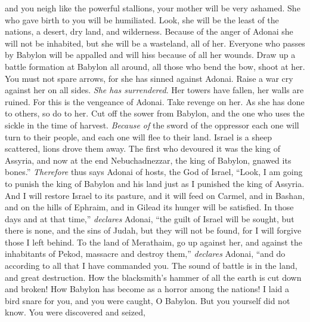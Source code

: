 \begin{biblechapter}
and you neigh like the powerful stallions,
\verse your mother will be very ashamed. 
She who gave birth to you will be humiliated. 
Look, she will be the least of the nations, 
a desert, dry land, and wilderness.
\verse Because of the anger of Adonai she will not be inhabited, 
but she will be a wasteland, all of her. 
Everyone who passes by Babylon will be appalled 
and will hiss because of all her wounds.
\verse Draw up a battle formation at Babylon all around, 
all those who bend the bow, shoot at her. 
You must not spare arrows, 
for she has sinned against Adonai.
\verse Raise a war cry against her on all sides. 
\textit{She has surrendered}. 
Her towers have fallen, 
her walls are ruined. 
For this is the vengeance of Adonai. 
Take revenge on her. 
As she has done to others, 
so do to her.
\verse Cut off the sower from Babylon, 
and the one who uses the sickle in the time of harvest. 
\textit{Because of} the sword of the oppressor 
each one will turn to their people, 
and each one will flee to their land.
\verse Israel is a sheep scattered, 
lions drove them away. 
The first who devoured it was the king of Assyria, 
and now at the end Nebuchadnezzar, the king of Babylon, gnawed its bones.”
\verse \textit{Therefore} thus says Adonai of hosts, the God of Israel,
\verse “Look, I am going to punish the king of Babylon and his land 
just as I punished the king of Assyria.
\verse And I will restore Israel to its pasture, 
and it will feed on Carmel, and in Bashan, 
and on the hills of Ephraim, and in Gilead 
its hunger will be satisfied.
\verse In those days and at that time,” \textit{declares} Adonai, 
“the guilt of Israel will be sought, but there is none, 
and the sins of Judah, but they will not be found, 
for I will forgive those I left behind.
\verse To the land of Merathaim, 
go up against her, 
and against the inhabitants of Pekod, 
massacre and destroy them,” \textit{declares} Adonai, 
“and do according to all that I have commanded you.
\verse The sound of battle is in the land, 
and great destruction.
\verse How the blacksmith’s hammer of all the earth is cut down and broken! 
How Babylon has become as a horror among the nations!
\verse I laid a bird snare for you, and you were caught, O Babylon. 
But you yourself did not know. 
You were discovered and seized, 

\end{biblechapter}
